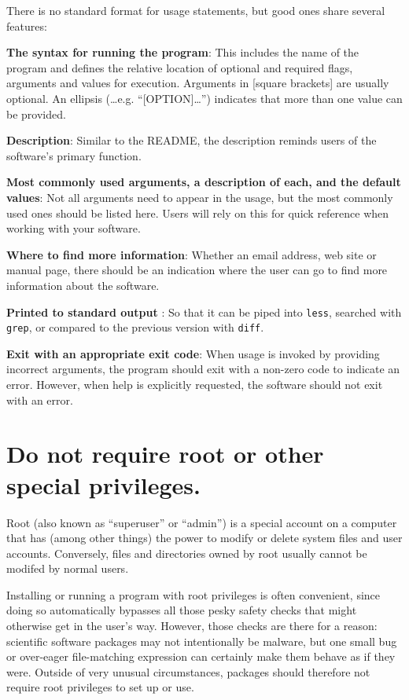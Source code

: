 \documentclass[10pt]{article}
\begin{document}
There is no standard format for usage statements, but good ones share
several features:

\textbf{The syntax for running the program}: This includes the name of the
program and defines the relative
location of optional and required flags, arguments and values for execution.
Arguments in {[}square brackets{]}
are usually optional. An ellipsis (\ldots e.g. ``{[}OPTION{]}\ldots{}'')
indicates that more than one value can be provided.

\textbf{Description}: Similar to the README, the
description reminds users of the software's primary function.

\textbf{Most commonly used arguments, a description of each, and the
default values}: Not all arguments need to appear in the usage, but the most
commonly used ones should be listed here. Users will rely on this for
quick reference when working with your software.

\textbf{Where to find more information}: Whether an email address, web
site or manual page, there should be an indication where the user can go
to find more information about the software.

\textbf{Printed to standard output} : So that it can be piped into
\texttt{less}, searched with \texttt{grep}, or compared to the previous
version with \texttt{diff}.

\textbf{Exit with an appropriate exit code}: When usage is invoked by
providing incorrect arguments, the program should exit with a non-zero
code to indicate an error. However, when help is explicitly requested,
the software should not exit with an error.

\section{Do not require root or other special privileges.}

Root (also known as ``superuser'' or ``admin'') is a special account on
a computer that has (among other things) the power to modify or delete
system files and user accounts. Conversely, files and directories owned
by root usually cannot be modifed by normal users.

Installing or running a program with root privileges is often
convenient, since doing so automatically bypasses all those pesky safety
checks that might otherwise get in the user's way. However, those checks
are there for a reason: scientific software packages may not
intentionally be malware, but one small bug or over-eager file-matching
expression can certainly make them behave as if they were. Outside of
very unusual circumstances, packages should therefore not require root
privileges to set up or use.
\end{document}
